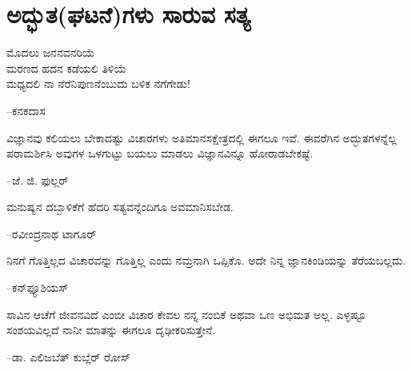 
\chapter{ಅದ್ಭುತ(ಘಟನೆ)ಗಳು ಸಾರುವ ಸತ್ಯ}

\item ಮೊದಲು ಜನನವನರಿಯೆ\\ಮರಣದ ಹದನ ಕಡೆಯಲಿ ತಿಳಿಯೆ\\ಮಧ್ಯದಲಿ ನಾ ನೆರೆನಿಪುಣನೆಂಬುದು ಬಳಿಕ ನಗೆಗೇಡು!\\
\begin{flushright}
–ಕನಕದಾಸ
\end{flushright}

 \item ವಿಜ್ಞಾನವು ಕಲಿಯಲು ಬೇಕಾದಷ್ಟು ವಿಚಾರಗಳು ಅತಿಮಾನಸಕ್ಷೇತ್ರದಲ್ಲಿ ಈಗಲೂ ಇವೆ. ಈವರೆಗಿನ ಅದ್ಭುತಗಳನ್ನೆಲ್ಲ ಪರಾಮರ್ಶಿಸಿ ಅವುಗಳ ಒಳಗುಟ್ಟು ಬಯಲು ಮಾಡಲು ವಿಜ್ಞಾನವಿನ್ನೂ ಹೋರಾಡಬೇಕಷ್ಟೆ.\\
\begin{flushright}
–ಜೆ. ಜಿ. ಫುಲ್ಲರ್​
\end{flushright}

 \item ಮನುಷ್ಯನ ದಬ್ಬಾಳಿಕೆಗೆ ಹೆದರಿ ಸತ್ಯವನ್ನೆಂದಿಗೂ ಅವಮಾನಿಸಬೇಡ.\\
\begin{flushright}
–ರವೀಂದ್ರನಾಥ ಟಾಗೂರ್​
\end{flushright}

 \item ನಿನಗೆ ಗೊತ್ತಿಲ್ಲದ ವಿಚಾರವನ್ನು ಗೊತ್ತಿಲ್ಲ ಎಂದು ನಮ್ರನಾಗಿ ಒಪ್ಪಿಕೊ. ಅದೇ ನಿನ್ನ ಜ್ಞಾನಕಿಂಡಿಯನ್ನು ತೆರೆಯಬಲ್ಲದು.\\
\begin{flushright}
–ಕನ್​ಫ್ಯೂಶಿಯಸ್​
\end{flushright}

 \item ಸಾವಿನ ಆಚೆಗೆ ಜೀವನವಿದೆ ಎಂಬೀ ವಿಚಾರ ಕೇವಲ ನನ್ನ ನಂಬಿಕೆ ಅಥವಾ ಒಣ ಅಭಿಮತ ಅಲ್ಲ. ಎಳ್ಳಷ್ಟೂ ಸಂಶಯವಿಲ್ಲದೆ ನಾನೀ ಮಾತನ್ನು ಈಗಲೂ ದೃಢೀಕರಿಸುತ್ತೇನೆ.\\
\begin{flushright}
–ಡಾ. ಎಲಿಜಬೆತ್ ಕುಬ್ಲೆರ್ ರೋಸ್
\end{flushright}

 \item {}\\
\begin{flushright}
\end{flushright}

 \item {}\\
\begin{flushright}
\end{flushright}

